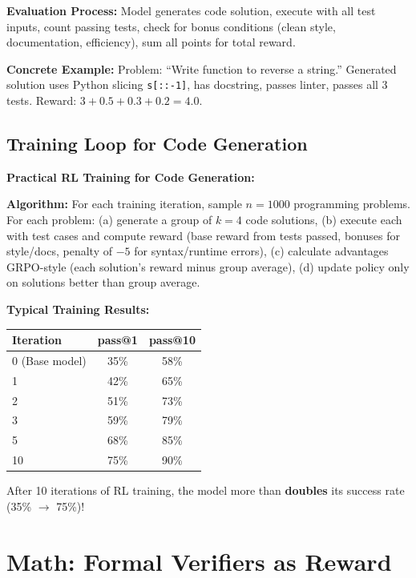 \begin{chapterenv}
\begin{infobox}
\textbf{Evaluation Process:} Model generates code solution, execute with all test inputs, count passing tests, check for bonus conditions (clean style, documentation, efficiency), sum all points for total reward.

\textbf{Concrete Example:} Problem: ``Write function to reverse a string.'' Generated solution uses Python slicing \texttt{s[::-1]}, has docstring, passes linter, passes all 3 tests. Reward: $3 + 0.5 + 0.3 + 0.2 = 4.0$.
\end{infobox}

\subsection{Training Loop for Code Generation}

\begin{infobox}
\textbf{Practical RL Training for Code Generation:}

\textbf{Algorithm:} For each training iteration, sample $n = 1000$ programming problems. For each problem: (a) generate a group of $k = 4$ code solutions, (b) execute each with test cases and compute reward (base reward from tests passed, bonuses for style/docs, penalty of $-5$ for syntax/runtime errors), (c) calculate advantages GRPO-style (each solution's reward minus group average), (d) update policy only on solutions better than group average.

\textbf{Typical Training Results:}

\begin{center}
\begin{tabular}{lcc}
\toprule
\textbf{Iteration} & \textbf{pass@1} & \textbf{pass@10} \\
\midrule
0 (Base model) & 35\% & 58\% \\
1 & 42\% & 65\% \\
2 & 51\% & 73\% \\
3 & 59\% & 79\% \\
5 & 68\% & 85\% \\
10 & 75\% & 90\% \\
\bottomrule
\end{tabular}
\end{center}

After 10 iterations of RL training, the model more than \textbf{doubles} its success rate (35\% $\to$ 75\%)!
\end{infobox}

\section{Math: Formal Verifiers as Reward}


\end{chapterenv}
